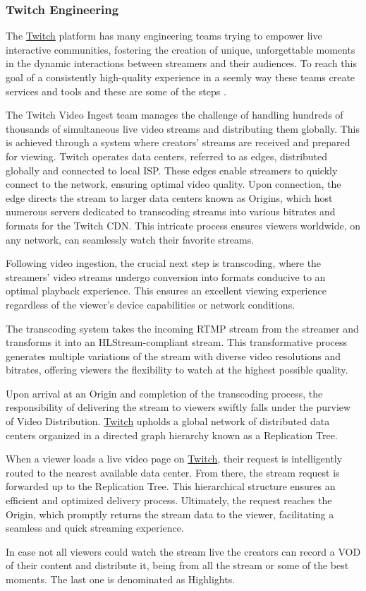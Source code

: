     \subsubsection*{Twitch Engineering}

    The \href{https://www.twitch.tv/}{Twitch} platform has many engineering teams trying to empower live interactive communities, fostering the creation of unique, unforgettable moments in the dynamic interactions between streamers and their audiences. To reach this goal of a consistently high-quality experience in a seemly way these teams create services and tools and these are some of the steps \cite{TwitchEngineering}.

    The Twitch Video Ingest team manages the challenge of handling hundreds of thousands of simultaneous live video streams and distributing them globally. This is achieved through a system where creators' streams are received and prepared for viewing. Twitch operates data centers, referred to as edges, distributed globally and connected to local \gls{ISP}. These edges enable streamers to quickly connect to the network, ensuring optimal video quality. Upon connection, the edge directs the stream to larger data centers known as Origins, which host numerous servers dedicated to transcoding streams into various bitrates and formats for the Twitch \gls{CDN}. This intricate process ensures viewers worldwide, on any network, can seamlessly watch their favorite streams.

    Following video ingestion, the crucial next step is transcoding, where the streamers' video streams undergo conversion into formats conducive to an optimal playback experience. This ensures an excellent viewing experience regardless of the viewer's device capabilities or network conditions.

    The transcoding system takes the incoming \gls{RTMP} stream from the streamer and transforms it into an \gls{HLStream}-compliant stream. This transformative process generates multiple variations of the stream with diverse video resolutions and bitrates, offering viewers the flexibility to watch at the highest possible quality.

    Upon arrival at an Origin and completion of the transcoding process, the responsibility of delivering the stream to viewers swiftly falls under the purview of Video Distribution. \href{https://www.twitch.tv/}{Twitch} upholds a global network of distributed data centers organized in a directed graph hierarchy known as a Replication Tree.

    When a viewer loads a live video page on \href{https://www.twitch.tv/}{Twitch}, their request is intelligently routed to the nearest available data center. From there, the stream request is forwarded up to the Replication Tree. This hierarchical structure ensures an efficient and optimized delivery process. Ultimately, the request reaches the Origin, which promptly returns the stream data to the viewer, facilitating a seamless and quick streaming experience.

    In case not all viewers could watch the stream live the creators can record a \gls{VOD} of their content and distribute it, being from all the stream or some of the best moments. The last one is denominated as Highlights.

